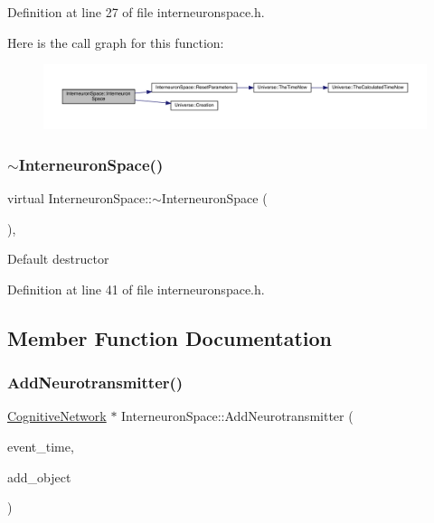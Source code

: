 Definition at line 27 of file interneuronspace.\+h.

Here is the call graph for this function\+:
\nopagebreak
\begin{figure}[H]
\begin{center}
\leavevmode
\includegraphics[width=350pt]{class_interneuron_space_aa87eb8c7186542989fccdadc594c5915_cgraph}
\end{center}
\end{figure}
\mbox{\label{class_interneuron_space_aff0056e3c60b7eff3ad4ca12f6756628}} 
\subsubsection{\texorpdfstring{$\sim$\+Interneuron\+Space()}{~InterneuronSpace()}}
{\footnotesize\ttfamily virtual Interneuron\+Space\+::$\sim$\+Interneuron\+Space (\begin{DoxyParamCaption}{ }\end{DoxyParamCaption})\hspace{0.3cm}{\ttfamily [inline]}, {\ttfamily [virtual]}}

Default destructor 

Definition at line 41 of file interneuronspace.\+h.



\subsection{Member Function Documentation}
\mbox{\label{class_interneuron_space_afee7374310b2a8c08bac232d62ea7aa1}} 
\subsubsection{\texorpdfstring{Add\+Neurotransmitter()}{AddNeurotransmitter()}}
{\footnotesize\ttfamily \hyperlink{class_cognitive_network}{Cognitive\+Network} $\ast$ Interneuron\+Space\+::\+Add\+Neurotransmitter (\begin{DoxyParamCaption}\item[{std\+::chrono\+::time\+\_\+point$<$ \hyperlink{universe_8h_a0ef8d951d1ca5ab3cfaf7ab4c7a6fd80}{Clock} $>$}]{event\+\_\+time,  }\item[{\hyperlink{class_cognitive_network}{Cognitive\+Network} $\ast$}]{add\+\_\+object }\end{DoxyParamCaption})}



